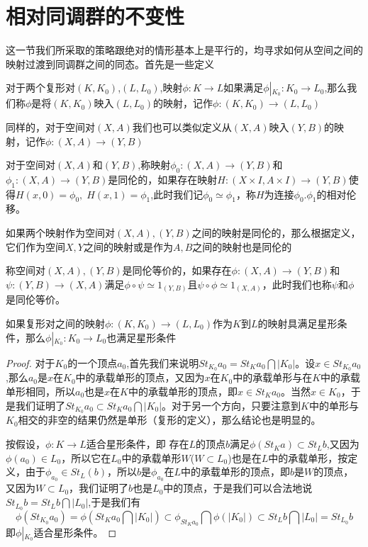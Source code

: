 \section{相对同调群的不变性}
这一节我们所采取的策略跟绝对的情形基本上是平行的，均寻求如何从空间之间的映射过渡到同调群之间的同态。首先是一些定义
\begin{definition}
对于两个复形对$(K,K_{0})$,$(L,L_{0})$,映射$\phi:K\rightarrow L$如果满足$\phi\left|_{K_{0}}\right.:K_{0}\rightarrow L_{0}$,那么我们称$\phi$是将$(K,K_{0})$映入$(L,L_{0})$的映射，记作$\phi:(K,K_{0})\rightarrow (L,L_{0})$
\end{definition}
同样的，对于空间对$(X,A)$我们也可以类似定义从$(X,A)$映入$(Y,B)$的映射，记作$\phi:(X,A)\rightarrow (Y,B)$
\begin{definition}
对于空间对$(X,A)$和$(Y,B)$,称映射$\phi_{0}:(X,A)\rightarrow (Y,B)$和$\phi_{1}:(X,A)\rightarrow (Y,B)$是同伦的，如果存在映射$H:(X\times I,A\times I)\rightarrow (Y,B)$使得$H(x,0)=\phi_{0},\;H(x,1)=\phi_{1}$,此时我们记$\phi_{0}\simeq \phi_{1}$，称$H$为连接$\phi_{0}.\phi_{1}$的相对伦移。
\end{definition}
\begin{remark}
如果两个映射作为空间对$(X,A),(Y,B)$之间的映射是同伦的，那么根据定义，它们作为空间$X,Y$之间的映射或是作为$A,B$之间的映射也是同伦的
\end{remark}
\begin{definition}
称空间对$(X,A),(Y,B)$是同伦等价的，如果存在$\phi:(X,A)\rightarrow (Y,B)$和$\psi:(Y,B)\rightarrow (X,A)$满足$\phi\circ\psi\simeq 1_{(Y,B)}$且$\psi\circ\phi\simeq 1_{(X,A)}$，此时我们也称$\psi$和$\phi$是同伦等价。
\end{definition}
\begin{proposition}\label{chap3_pro_361}
如果复形对之间的映射$\phi:(K,K_{0})\rightarrow (L,L_{0})$作为$K$到$L$的映射具满足星形条件，那么$\phi\left|_{K_{0}}\right.:K_{0}\rightarrow L_{0}$也满足星形条件
\end{proposition}
\begin{proof}
对于$K_{0}$的一个顶点$a_{0}$,首先我们来说明$St_{K_{0}}a_{0}=St_{K}a_{0}\bigcap |K_{0}|$。设$x\in St_{K_{0}}a_{0}$,那么$a_{0}$是$x$在$K_{0}$中的承载单形的顶点，又因为$x$在$K_{0}$中的承载单形与在$K$中的承载单形相同，所以$a_{0}$也是$x$在$K$中的承载单形的顶点，即$x\in St_{K}a_{0}$。当然$x\in K_{0}$，于是我们证明了$St_{K_{0}}a_{0}\subset St_{K}a_{0}\bigcap |K_{0}|$。对于另一个方向，只要注意到$K$中的单形与$K_{0}$相交的非空的结果仍然是单形（复形的定义），那么结论也是明显的。

按假设，$\phi:K\rightarrow L$适合星形条件，即  存在$L$的顶点$b$满足$\phi(St_{K}a)\subset St_{L}b$,又因为$\phi(a_{0})\in L_{0}$，所以它在$L_{0}$中的承载单形$W$($W\subset L_{0}$)也是在$L$中的承载单形，按定义，由于$\phi_{a_{0}}\in St_{L}(b)$，所以$b$是$\phi_{a_{0}}$在$L$中的承载单形的顶点，即$b$是$W$的顶点，又因为$W\subset L_{0}$，我们证明了$b$也是$L_{0}$中的顶点，于是我们可以合法地说$St_{L_{0}}b=St_{L}b\bigcap |L_{0}|$,于是我们有
$$\phi(St_{K_{0}}a_{0})=\phi(St_{K}a_{0}\bigcap |K_{0}|)\subset \phi_{St_{K}a_{0}}\bigcap \phi(|K_{0}|)\subset St_{L}b\bigcap |L_{0}|=St_{L_{0}}b$$
即$\phi\left|_{K_{0}}\right.$适合星形条件。
\end{proof}
